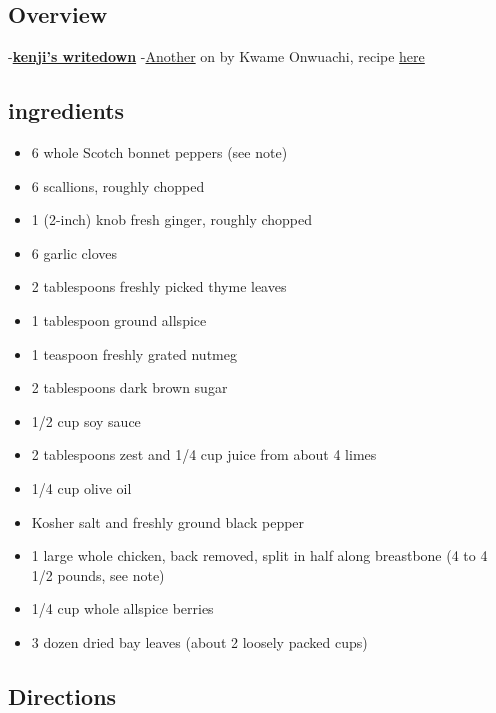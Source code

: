 \documentclass[]{article}
\providecommand{\tightlist}{%
  \setlength{\itemsep}{0pt}\setlength{\parskip}{0pt}}
\begin{document}
\hypertarget{overview}{%
\subsection{Overview}\label{overview}}

-\href{https://www.seriouseats.com/2013/08/the-food-lab-how-to-make-jerk-chicken-at-home.html}{\textbf{kenji's writedown}}
-\href{https://www.youtube.com/watch?v=Rt460jKi4Bk}{Another} on by Kwame Onwuachi, recipe \href{https://www.vice.com/en_us/article/akw3bb/the-best-jerk-chicken-recipe}{here}

\hypertarget{ingredients-1}{%
\subsection{ingredients}\label{ingredients-1}}

\begin{itemize}
\tightlist
\item
  6 whole Scotch bonnet peppers (see note)
\item
  6 scallions, roughly chopped
\item
  1 (2-inch) knob fresh ginger, roughly chopped
\item
  6 garlic cloves
\item
  2 tablespoons freshly picked thyme leaves
\item
  1 tablespoon ground allspice
\item
  1 teaspoon freshly grated nutmeg
\item
  2 tablespoons dark brown sugar
\item
  1/2 cup soy sauce
\item
  2 tablespoons zest and 1/4 cup juice from about 4 limes
\item
  1/4 cup olive oil
\item
  Kosher salt and freshly ground black pepper
\item
  1 large whole chicken, back removed, split in half along breastbone (4 to 4 1/2 pounds, see note)
\item
  1/4 cup whole allspice berries
\item
  3 dozen dried bay leaves (about 2 loosely packed cups)
\end{itemize}

\hypertarget{directions}{%
\subsection{Directions}\label{directions}}
\end{document}
